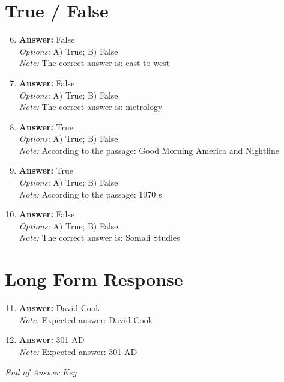 \documentclass[12pt]{article}
\begin{document}
\section*{True / False}
\begin{enumerate}[label=\arabic*.]
\setcounter{enumi}{5}
\item \textbf{Answer:} False
\\ \textit{Options:} A) True; B) False
\\ \textit{Note:} The correct answer is: east to west
\item \textbf{Answer:} False
\\ \textit{Options:} A) True; B) False
\\ \textit{Note:} The correct answer is: metrology
\item \textbf{Answer:} True
\\ \textit{Options:} A) True; B) False
\\ \textit{Note:} According to the passage: Good Morning America and Nightline
\item \textbf{Answer:} True
\\ \textit{Options:} A) True; B) False
\\ \textit{Note:} According to the passage: 1970 s
\item \textbf{Answer:} False
\\ \textit{Options:} A) True; B) False
\\ \textit{Note:} The correct answer is: Somali Studies
\end{enumerate}

\section*{Long Form Response}
\begin{enumerate}[label=\arabic*.]
\setcounter{enumi}{10}
\item \textbf{Answer:} David Cook
\\ \textit{Note:} Expected answer: David Cook
\item \textbf{Answer:} 301 AD
\\ \textit{Note:} Expected answer: 301 AD
\end{enumerate}

\vfill
\noindent\textit{End of Answer Key}
\end{document}
